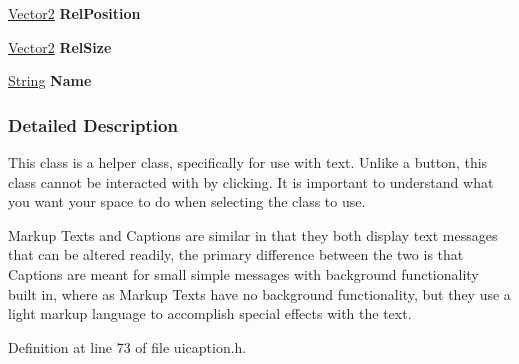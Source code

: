 \begin{DoxyCompactItemize}
\item 
\hypertarget{classphys_1_1UI_1_1Caption_a63061f6c9799bea406eba1060ec9daa4}{
\hyperlink{classphys_1_1Vector2}{Vector2} {\bfseries RelPosition}}
\label{d4/dfe/classphys_1_1UI_1_1Caption_a63061f6c9799bea406eba1060ec9daa4}

\item 
\hypertarget{classphys_1_1UI_1_1Caption_acd511c5bc0d19986a1869d5d5e4f9094}{
\hyperlink{classphys_1_1Vector2}{Vector2} {\bfseries RelSize}}
\label{d4/dfe/classphys_1_1UI_1_1Caption_acd511c5bc0d19986a1869d5d5e4f9094}

\item 
\hypertarget{classphys_1_1UI_1_1Caption_a6d5f0c79c720695e3f4e009e590a8827}{
\hyperlink{namespacephys_aa03900411993de7fbfec4789bc1d392e}{String} {\bfseries Name}}
\label{d4/dfe/classphys_1_1UI_1_1Caption_a6d5f0c79c720695e3f4e009e590a8827}

\end{DoxyCompactItemize}


\subsubsection{Detailed Description}
This class is a helper class, specifically for use with text. Unlike a button, this class cannot be interacted with by clicking. It is important to understand what you want your space to do when selecting the class to use. \par
 \par
 Markup Texts and Captions are similar in that they both display text messages that can be altered readily, the primary difference between the two is that Captions are meant for small simple messages with background functionality built in, where as Markup Texts have no background functionality, but they use a light markup language to accomplish special effects with the text. 

Definition at line 73 of file uicaption.h.



